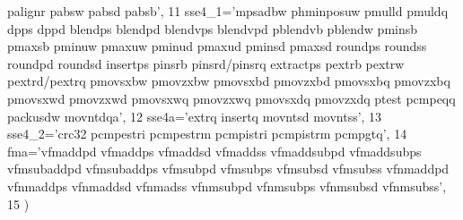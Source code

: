 \begin{DoxyCode}
{       palignr pabsw pabsd pabsb'},
11     sse4\_1=\textcolor{stringliteral}{'mpsadbw phminposuw pmulld pmuldq     dpps dppd     blendps blendpd blendvps blendvpd pblendvb
       pblendw     pminsb pmaxsb pminuw pmaxuw pminud pmaxud pminsd pmaxsd     roundps roundss roundpd roundsd    
       insertps pinsrb pinsrd/pinsrq extractps pextrb pextrw pextrd/pextrq     pmovsxbw pmovzxbw pmovsxbd pmovzxbd
       pmovsxbq pmovzxbq pmovsxwd pmovzxwd pmovsxwq pmovzxwq pmovsxdq pmovzxdq     ptest     pcmpeqq     packusdw   
        movntdqa'},
12     sse4a=\textcolor{stringliteral}{'extrq insertq movntsd movntss'},
13     sse4\_2=\textcolor{stringliteral}{'crc32     pcmpestri     pcmpestrm     pcmpistri     pcmpistrm     pcmpgtq'},
14     fma=\textcolor{stringliteral}{'vfmaddpd vfmaddps vfmaddsd vfmaddss vfmaddsubpd vfmaddsubps vfmsubaddpd vfmsubaddps vfmsubpd
       vfmsubps vfmsubsd vfmsubss vfnmaddpd vfnmaddps vfnmaddsd vfnmadss vfnmsubpd vfnmsubps vfnmsubsd vfnmsubss'},
15 )
\end{DoxyCode}
\hypertarget{namespacedetect__cpu__extensions__wine_a445913570ab2aa910316aa03d9dac2a6}{}
